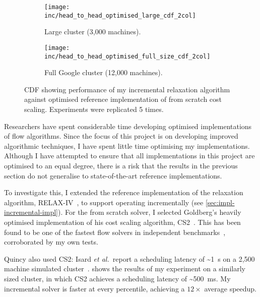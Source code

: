 \begin{figure}
    \begin{widepage}
        \begin{subfigure}[c]{0.5\textwidth}
            \texttt{[image: inc/head\_to\_head\_optimised\_large\_cdf\_2col]}
            \caption{Large cluster (3,000 machines).}
            \label{fig:inc-head-to-head-optimised:large}
        \end{subfigure}
        \begin{subfigure}[c]{0.5\textwidth}
            \texttt{[image: inc/head\_to\_head\_optimised\_full\_size\_cdf\_2col]}
            \caption{Full Google cluster (12,000 machines).}
            \label{fig:inc-head-to-head-optimised:full-size}
        \end{subfigure}
    \end{widepage}
    \caption[Performance of my incremental algorithm against optimised reference implementation]{CDF showing performance of my incremental relaxation algorithm against optimised reference implementation of from scratch cost scaling. Experiments were replicated 5 times.}
    \label{fig:inc-head-to-head-optimised}
\end{figure}

Researchers have spent considerable time developing optimised implementations of flow algorithms. Since the focus of this project is on developing improved algorithmic techniques, I have spent little time optimising my implementations. Although I have attempted to ensure that all implementations in this project are optimised to an equal degree, there is a risk that the results in the previous section do not generalise to state-of-the-art reference implementations. 

To investigate this, I extended the reference implementation of the relaxation algorithm, RELAX-IV~\cite{RelaxIV:2011}, to support operating incrementally (see \cref{sec:impl-incremental-impl}). For the from scratch solver, I selected Goldberg's heavily optimised implementation of his cost scaling algorithm, CS2~\cite{CS2:2009}. This has been found to be one of the fastest flow solvers in independent benchmarks~\cite{KiralyKovacs:2012}, corroborated by my own tests.

Quincy also used CS2: Isard \textit{et al.}\ report a scheduling latency of \textasciitilde\SI{1}{\second} on a 2,500 machine simulated cluster~\cite{Isard:2009}.  shows the results of my experiment on a similarly sized cluster, in which CS2 achieves a scheduling latency of \textasciitilde\SI{500}{\milli\second}. My incremental solver is faster at every percentile, achieving a $12\times$ average speedup.

